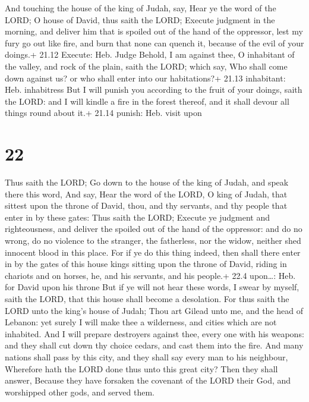  And touching the house of the king of Judah, say, Hear
ye the word of the LORD;  O house of David, thus saith the
LORD; Execute judgment in the morning, and deliver him that is spoiled
out of the hand of the oppressor, lest my fury go out like fire, and
burn that none can quench it, because of the evil of your doings.+ 21.12
Execute: Heb. Judge  Behold, I am against thee, O
inhabitant of the valley, and rock of the plain, saith the LORD; which
say, Who shall come down against us? or who shall enter into our
habitations?+ 21.13 inhabitant: Heb. inhabitress  But I
will punish you according to the fruit of your doings, saith the LORD:
and I will kindle a fire in the forest thereof, and it shall devour all
things round about it.+ 21.14 punish: Heb. visit upon

\hypertarget{section-21}{%
\section{22}\label{section-21}}

 Thus saith the LORD; Go down to the house of the king of
Judah, and speak there this word,  And say, Hear the word of
the LORD, O king of Judah, that sittest upon the throne of David, thou,
and thy servants, and thy people that enter in by these gates:
 Thus saith the LORD; Execute ye judgment and righteousness,
and deliver the spoiled out of the hand of the oppressor: and do no
wrong, do no violence to the stranger, the fatherless, nor the widow,
neither shed innocent blood in this place.  For if ye do
this thing indeed, then shall there enter in by the gates of this house
kings sitting upon the throne of David, riding in chariots and on
horses, he, and his servants, and his people.+ 22.4 upon\ldots: Heb. for
David upon his throne  But if ye will not hear these words,
I swear by myself, saith the LORD, that this house shall become a
desolation.  For thus saith the LORD unto the king's house
of Judah; Thou art Gilead unto me, and the head of Lebanon: yet surely I
will make thee a wilderness, and cities which are not inhabited.
 And I will prepare destroyers against thee, every one with
his weapons: and they shall cut down thy choice cedars, and cast them
into the fire.  And many nations shall pass by this city,
and they shall say every man to his neighbour, Wherefore hath the LORD
done thus unto this great city?  Then they shall answer,
Because they have forsaken the covenant of the LORD their God, and
worshipped other gods, and served them.

